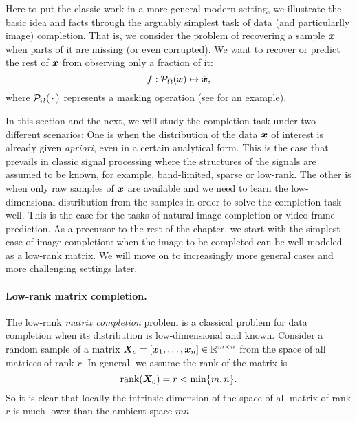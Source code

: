 \documentclass[../../book-main.tex]{subfiles}
\begin{document}
Here to put the classic work in a more general modern setting, we illustrate the basic idea and facts through the arguably simplest task of data (and particularlly image)  completion. That is, we consider the problem of recovering a sample $\bm{x}$ when parts of it are missing (or even corrupted). We want to recover or predict the rest of $\bm{x}$
from observing only a fraction of it:
\begin{equation}
f: \mathcal{P}_{\Omega}(\bm{x}) \mapsto \hat{\bm{x}},
\end{equation}
where $\mathcal{P}_{\Omega}(\,\cdot\,)$ represents a masking operation
(see  for an example).

In this section and the next, we will study the completion task under two different scenarios: One is when the distribution of the data $\bm{x}$ of interest is already given {\em apriori}, even in a certain analytical form. This is the case that prevails in classic signal processing where the structures of the signals are assumed to be known, for example,  band-limited, sparse or low-rank. The other is when only raw samples of $\bm{x}$ are available and we need to learn the low-dimensional distribution from the samples in order to solve the completion task well. This is the case for the tasks of natural image completion or video frame prediction. As a precursor to the rest of the chapter, we start with the simplest case of image completion: when the image to be completed can be well modeled as a low-rank matrix. We will move on to increasingly more general cases and more challenging settings later.

\paragraph{Low-rank matrix completion.}  
The low-rank {\em matrix
completion} problem is a classical problem for data completion when its distribution is low-dimensional and known. Consider a  random sample of a matrix $\bm{X}_o =
[\bm{x}_1, \ldots, \bm{x}_n] \in \mathbb{R}^{m\times n}$ from the space of all matrices of rank $r$. In general, we assume the rank
of the matrix is
\begin{equation}
\mbox{rank}(\bm{X}_o) = r < \min\{m, n\}.
\end{equation}
So it is clear that locally the intrinsic dimension of the space of all matrix of rank $r$ is much lower than the ambient space $mn$.
\end{document}
